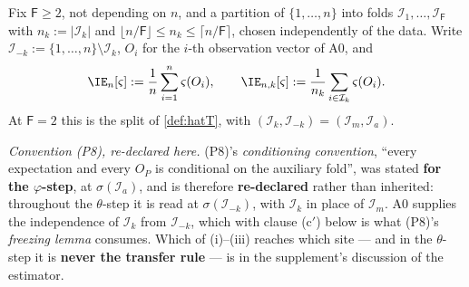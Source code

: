\begin{definition}\label{def:crossfit}
Fix $\mathsf F\ge2$, not depending on $n$, and a partition of $\{1,\dots,n\}$ into folds
$\mathcal I_1,\dots,\mathcal I_{\mathsf F}$ with $n_k:=|\mathcal I_k|$ and
$\lfloor n/\mathsf F\rfloor\le n_k\le\lceil n/\mathsf F\rceil$, chosen independently of the data. Write
$\mathcal I_{-k}:=\{1,\dots,n\}\setminus\mathcal I_k$, $O_i$ for the $i$-th observation vector of A0, and
\[
\IE_n[\varsigma]:=\frac1n\sum_{i=1}^{n}\varsigma(O_i),
\qquad
\IE_{n,k}[\varsigma]:=\frac1{n_k}\sum_{i\in\mathcal I_k}\varsigma(O_i) .
\]
At $\mathsf F=2$ this is the split of \cref{def:hatT}, with $(\mathcal I_k,\mathcal I_{-k})=(\mathcal I_m,\mathcal I_a)$.

\emph{Convention \textup{(P8)}, re-declared here.} \textup{(P8)}'s \emph{conditioning convention},
``every expectation and every $O_P$ is conditional on the auxiliary fold'', was stated \textbf{for the
$\varphi$-step}, at $\sigma(\mathcal I_a)$, and is therefore \textbf{re-declared} rather than inherited:
throughout the $\theta$-step it is read at $\sigma(\mathcal I_{-k})$, with $\mathcal I_k$ in place of
$\mathcal I_m$. A0 supplies the independence of $\mathcal I_k$ from $\mathcal I_{-k}$, which with clause
\textup{(c$'$)} below is what \textup{(P8)}'s \emph{freezing lemma} consumes. Which of
(i)--(iii) reaches which site --- and in the $\theta$-step it is \textbf{never the
transfer rule} --- is in the supplement's discussion of the estimator.


\end{definition}
